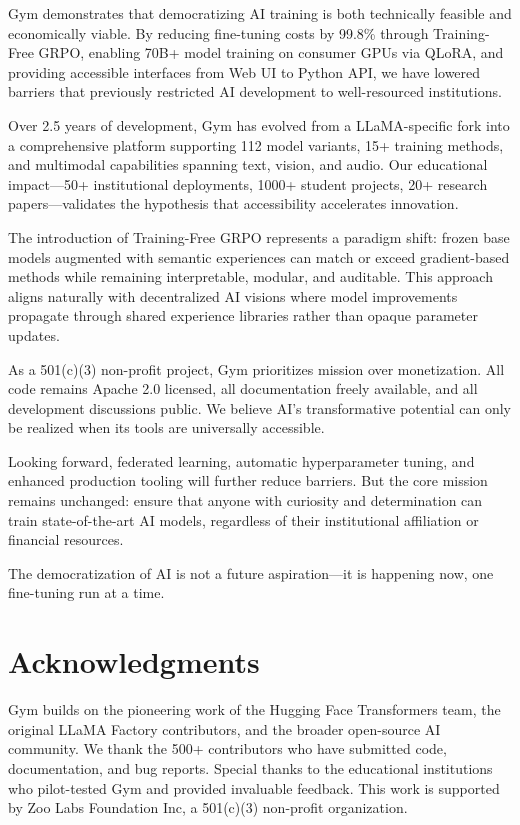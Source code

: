 \documentclass[11pt,letterpaper]{article}
\begin{document}
Gym demonstrates that democratizing AI training is both technically feasible and economically viable. By reducing fine-tuning costs by 99.8\% through Training-Free GRPO, enabling 70B+ model training on consumer GPUs via QLoRA, and providing accessible interfaces from Web UI to Python API, we have lowered barriers that previously restricted AI development to well-resourced institutions.

Over 2.5 years of development, Gym has evolved from a LLaMA-specific fork into a comprehensive platform supporting 112 model variants, 15+ training methods, and multimodal capabilities spanning text, vision, and audio. Our educational impact—50+ institutional deployments, 1000+ student projects, 20+ research papers—validates the hypothesis that accessibility accelerates innovation.

The introduction of Training-Free GRPO represents a paradigm shift: frozen base models augmented with semantic experiences can match or exceed gradient-based methods while remaining interpretable, modular, and auditable. This approach aligns naturally with decentralized AI visions where model improvements propagate through shared experience libraries rather than opaque parameter updates.

As a 501(c)(3) non-profit project, Gym prioritizes mission over monetization. All code remains Apache 2.0 licensed, all documentation freely available, and all development discussions public. We believe AI's transformative potential can only be realized when its tools are universally accessible.

Looking forward, federated learning, automatic hyperparameter tuning, and enhanced production tooling will further reduce barriers. But the core mission remains unchanged: ensure that anyone with curiosity and determination can train state-of-the-art AI models, regardless of their institutional affiliation or financial resources.

The democratization of AI is not a future aspiration—it is happening now, one fine-tuning run at a time.

\section*{Acknowledgments}

Gym builds on the pioneering work of the Hugging Face Transformers team, the original LLaMA Factory contributors, and the broader open-source AI community. We thank the 500+ contributors who have submitted code, documentation, and bug reports. Special thanks to the educational institutions who pilot-tested Gym and provided invaluable feedback. This work is supported by Zoo Labs Foundation Inc, a 501(c)(3) non-profit organization.
\end{document}
